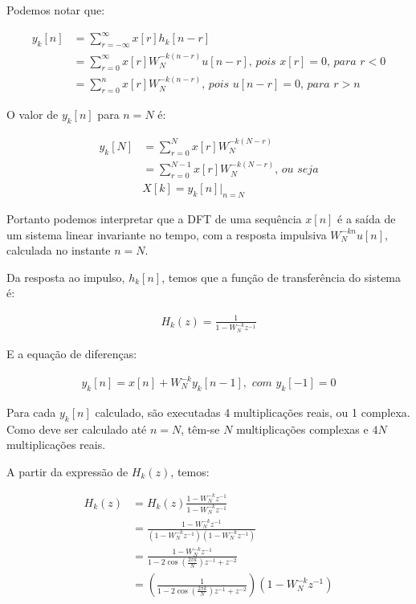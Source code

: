 \documentclass[monografia]{subfiles}
\begin{document}
		Podemos notar que:

		\begin{align}
			y_{k}[n]	&= \sum_{r=-\infty}^{\infty} x[r]h_k[n-r]\\
								&= \sum_{r=0}^{\infty}x[r]  W_{N}^{-k(n-r)} u[n-r] \textit{, pois } x[r] = 0 \textit{, para } r<0\\
								&= \sum_{r=0}^{n}x[r]  W_{N}^{-k(n-r)} \textit{, pois } u[n-r] = 0 \textit{, para } r>n
		\end{align}

		O valor de $y_k[n]$ para $n=N$ é:

		\begin{align}
			y_{k}[N]	&= \sum_{r=0}^{N}x[r]  W_{N}^{-k(N-r)}\\
								&= \sum_{r=0}^{N-1}x[r]  W_{N}^{-k(N-r)}\textit{, ou seja}\\
								&X[k] = y_k[n]|_{n=N}
		\end{align}

		Portanto podemos interpretar que a DFT de uma sequência $x[n]$ é a saída de um sistema linear invariante no tempo, com a resposta
		impulsiva $W_N^{-kn}u[n]$, calculada no instante $n=N$. 
		
		Da resposta ao impulso, $h_k[n]$, temos que a função de transferência do sistema é:

		\begin{align}
			H_k(z) = \frac{1}{1 - W_N^{-k} z^{-1}}
		\end{align}

		E a equação de diferenças:

		\begin{align}
			y_k[n] = x[n] + W_N^{-k} y_k[n-1], \textit{ com } y_k[-1]=0
		\end{align}

		Para cada $y_k[n]$ calculado, são executadas 4 multiplicações reais, ou 1 complexa. Como deve ser calculado até $n=N$, têm-se
		$N$ multiplicações complexas e $4N$ multiplicações reais.

		A partir da expressão de $H_k(z)$, temos:

		\begin{align}
			H_k(z)	&= H_k(z) \frac{1 - W_N^{-k} z^{-1}}{1 - W_N^{-k} z^{-1}}\\
							&= \frac{1 - W_N^{-k} z^{-1}}{(1 - W_N^{-k} z^{-1})(1 - W_N^{-k} z^{-1})}\\
							&= \frac{1 - W_N^{-k} z^{-1}}{1 - 2\cos(\frac{2 \pi k}{N}) z^{-1} + z^{-2}  }\\
							&= {\left ( \frac{1}{1 - 2\cos(\frac{2 \pi k}{N}) z^{-1} + z^{-2}} \right )} {\left ( 1 - W_N^{-k} z^{-1} \right )}
		\end{align}
\end{document}
